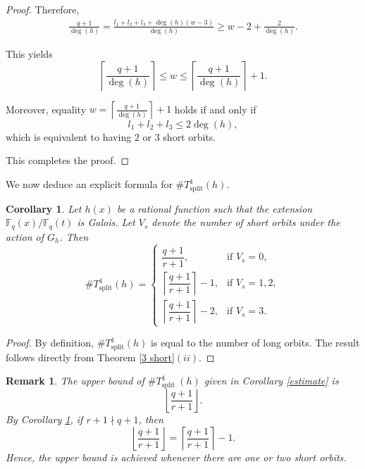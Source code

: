 \documentclass[1p,final]{elsarticle}
\newtheorem{corollary}[theorem]{Corollary}
\newtheorem{open problem}[theorem]{Open Problem}
\newtheorem{remark}[theorem]{Remark}
\begin{document}
\begin{proof}
Therefore,
\begin{equation}\label{os}
\begin{aligned}
\frac{q+1}{\deg(h)}
=
\frac{l_{1}+l_{2}+l_{3}+\deg(h)(w-3)}{\deg(h)}
\ge
w-2+\frac{2}{\deg(h)}.
\end{aligned}
\end{equation}

This yields
\[
\left \lceil \frac{q+1}{\deg(h)} \right \rceil \le w \le \left \lceil \frac{q+1}{\deg(h)} \right \rceil +1.
\]

Moreover, equality $w=\left \lceil \frac{q+1}{\deg(h)} \right \rceil+1$ holds if and only if
\[
l_{1}+l_{2}+l_{3}\le 2\deg(h),
\]
which is equivalent to having $2$ or $3$ short orbits.

This completes the proof.
\end{proof}

\medskip

We now deduce an explicit formula for $\# T_{\text{split}}^1(h)$.

\begin{corollary}\label{good 3}
Let $h(x)$ be a rational function such that the extension $\mathbb{F}_{q}(x)/\mathbb{F}_{q}(t)$ is Galois. Let $V_{s}$ denote the number of short orbits under the action of $G_{h}$. Then
\[
\# T_{\text{split}}^1(h) =
\begin{cases}
\dfrac{q+1}{r+1}, & \text{if } V_s = 0, \\[2ex]
\left\lceil \dfrac{q+1}{r+1} \right\rceil - 1, & \text{if } V_s = 1,2, \\[2ex]
\left\lceil \dfrac{q+1}{r+1} \right\rceil - 2, & \text{if } V_s = 3.
\end{cases}
\]
\end{corollary}

\begin{proof}
By definition, $\# T_{\text{split}}^1(h)$ is equal to the number of long orbits. The result follows directly from Theorem \ref{3 short}$(ii)$.
\end{proof}

\medskip

\begin{remark}\label{remark bound}
The upper bound of $\# T_{\text {split }}^1(h)$ given in Corollary \ref{estimate} is 
\[
\left \lfloor   \frac{q+1}{r+1} \right \rfloor.
\]
By Corollary \ref{good 3}, if $r+1\nmid q+1$, then
\[
\left \lfloor \frac{q+1}{r+1} \right \rfloor
=
\left \lceil \frac{q+1}{r+1} \right \rceil -1.
\]
Hence, the upper bound is achieved whenever there are one or two short orbits.
\end{remark}
\end{document}
